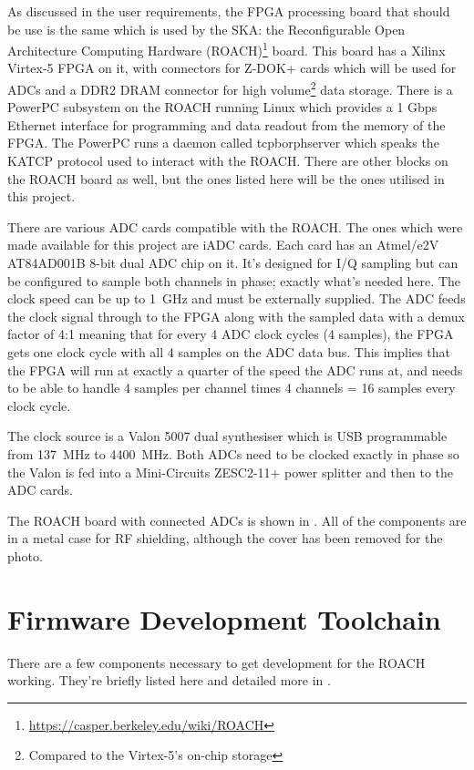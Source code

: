 As discussed in the user requirements, the FPGA processing board that should be use is the same which is used by the SKA: the Reconfigurable Open Architecture Computing Hardware (ROACH)\footnote{\url{https://casper.berkeley.edu/wiki/ROACH}} board. This board has a Xilinx Virtex-5 FPGA on it, with connectors for Z-DOK+ cards which will be used for ADCs and a DDR2 DRAM connector for high volume\footnote{Compared to the Virtex-5's on-chip storage} data storage. There is a PowerPC subsystem on the ROACH running Linux which provides a 1 Gbps Ethernet interface for programming and data readout from the memory of the FPGA. The PowerPC runs a daemon called tcpborphserver which speaks the KATCP protocol used to interact with the ROACH. There are other blocks on the ROACH board as well, but the ones listed here will be the ones utilised in this project.

There are various ADC cards compatible with the ROACH. The ones which were made available for this project are iADC cards. Each card has an Atmel/e2V AT84AD001B 8-bit dual ADC chip on it. It's designed for I/Q sampling but can be configured to sample both channels in phase; exactly what's needed here. The clock speed can be up to \SI{1}{\giga\hertz} and must be externally supplied. The ADC feeds the clock signal through to the FPGA along with the sampled data with a demux factor of 4:1 meaning that for every 4 ADC clock cycles (4 samples), the FPGA gets one clock cycle with all 4 samples on the ADC data bus. This implies that the FPGA will run at exactly a quarter of the speed the ADC runs at, and needs to be able to handle 4 samples per channel times 4 channels = 16 samples every clock cycle.

The clock source is a Valon 5007 dual synthesiser which is USB programmable from \SI{137}{\mega\hertz} to \SI{4400}{\mega\hertz}. Both ADCs need to be clocked exactly in phase so the Valon is fed into a Mini-Circuits ZESC2-11+ power splitter and then to the ADC cards.

The ROACH board with connected ADCs is shown in . All of the components are in a metal case for RF shielding, although the cover has been removed for the photo.


\section{Firmware Development Toolchain}
There are a few components necessary to get development for the ROACH working. They're briefly listed here and detailed more in .\\

